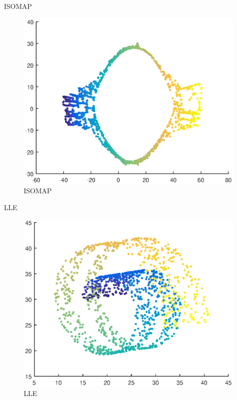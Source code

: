 \documentclass{beamer}
\begin{document}
\begin{darkframes}
   \begin{frame}{ISOMAP}
   \begin{figure}
   \centering
   \includegraphics[scale=0.5]{./figs/isomap.eps}
   \caption{ISOMAP}
   \end{figure}
   \end{frame}   
   
   \begin{frame}{LLE}
   \begin{figure}
   \centering
   \includegraphics[scale=0.5]{./figs/lle.eps}
   \caption{LLE}
   \end{figure}
   \end{frame}
   

\end{darkframes}
\end{document}
